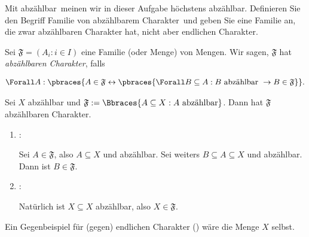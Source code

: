 
\begin{exercise}[278]

Mit \glqq abzählbar\grqq\  meinen wir in dieser Aufgabe \glqq höchstens abzählbar\grqq.
Definieren Sie den Begriff \glqq Familie von abzählbarem Charakter\grqq\ und geben
Sie eine Familie an, die zwar abzählbaren Charakter hat, nicht aber endlichen Charakter.

\end{exercise}


\begin{solution}

Sei $\mathfrak{F} = (A_i: i \in I)$ eine Familie (oder Menge) von Mengen.
Wir sagen, $\mathfrak{F}$ hat \textit{abzählbaren Charakter}, falls

\begin{align*}
  \Forall A:
  \pbraces
  {
    A \in \mathfrak{F}
    \leftrightarrow
    \pbraces
    {
      \Forall B \subseteq A:
      B ~\text{abzählbar}~
      \to
      B \in \mathfrak{F}
    }
  }.
\end{align*}


  Sei $X$ abzählbar und $\mathfrak{F} := \Bbraces{A \subseteq X: A ~\text{abzählbar}}$.
  Dann hat $\mathfrak{F}$ abzählbaren Charakter.

  \begin{enumerate}[label = \texttt{ad}]

    \item \Quote{$\to$}:

    Sei $A \in \mathfrak{F}$, also $A \subseteq X$ und abzählbar.
    Sei weiters $B \subseteq A \subseteq X$ und abzählbar.
    Dann ist $B \in \mathfrak{F}$.

    \item \Quote{$\leftarrow$}:

    Natürlich ist $X \subseteq X$ abzählbar, also $X \in \mathfrak{F}$.

  \end{enumerate}

  Ein Gegenbeispiel für (gegen) endlichen Charakter (\Quote{$\not \leftarrow$}) wäre die Menge $X$ selbst.


\end{solution}

